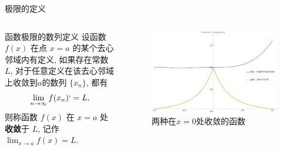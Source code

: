 \documentclass[
10pt,  
aspectratio=43,  
]{beamer}
\begin{document}
\begin{frame}[c]{极限的定义}
	\begin{columns}[onlytextwidth]
		
		\begin{block}{函数极限的数列定义}
			设函数 $f(x)$ 在点 $x=a$ 的某个去心邻域内有定义,  如果存在常数 $L$,  对于任意定义在该去心邻域上收敛到$a$的数列 $\{x_n\}$,  都有 
			\begin{equation*}
				\lim_{n\to\infty} f(x_n)` = L,  
			\end{equation*}
			则称函数 $f(x)$ 在 $x=a$ 处\textbf{收敛}于 $L$,  记作 $\lim_{x \to a} f(x) = L$.
		\end{block}
		
		
		\begin{figure}
			\centering
			\includegraphics[width=0.9\linewidth]{convergent function1.png}
			\caption{两种在$x=0$处收敛的函数}
			
		\end{figure}
	\end{columns}
\end{frame}	
\end{document}
